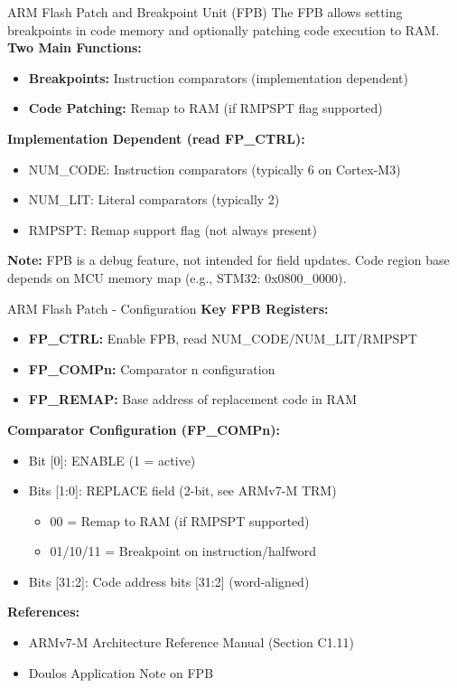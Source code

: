 \documentclass{beamer}
\begin{document}
\begin{frame}{ARM}
	{Flash Patch and Breakpoint Unit (FPB)}
	The FPB allows setting breakpoints in code memory and optionally patching code execution to RAM.\\
	\vspace{0.2cm}
	\textbf{Two Main Functions:}
	\begin{itemize}
		\item \textbf{Breakpoints:} Instruction comparators (implementation dependent)
		\item \textbf{Code Patching:} Remap to RAM (if RMPSPT flag supported)
	\end{itemize}
	\vspace{0.2cm}
	\textbf{Implementation Dependent (read FP\_CTRL):}
	\begin{itemize}
		\item NUM\_CODE: Instruction comparators (typically 6 on Cortex-M3)
		\item NUM\_LIT: Literal comparators (typically 2)
		\item RMPSPT: Remap support flag (not always present)
	\end{itemize}
	\vspace{0.2cm}
	\textbf{Note:} FPB is a debug feature, not intended for field updates. Code region base depends on MCU memory map (e.g., STM32: 0x0800\_0000).
\end{frame}

\begin{frame}{ARM}
	{Flash Patch - Configuration}
	\textbf{Key FPB Registers:}
	\begin{itemize}
		\item \textbf{FP\_CTRL:} Enable FPB, read NUM\_CODE/NUM\_LIT/RMPSPT
		\item \textbf{FP\_COMPn:} Comparator n configuration
		\item \textbf{FP\_REMAP:} Base address of replacement code in RAM
	\end{itemize}
	\vspace{0.2cm}
	\textbf{Comparator Configuration (FP\_COMPn):}
	\begin{itemize}
		\item Bit [0]: ENABLE (1 = active)
		\item Bits [1:0]: REPLACE field (2-bit, see ARMv7-M TRM)
		\begin{itemize}
			\item 00 = Remap to RAM (if RMPSPT supported)
			\item 01/10/11 = Breakpoint on instruction/halfword
		\end{itemize}
		\item Bits [31:2]: Code address bits [31:2] (word-aligned)
	\end{itemize}
	\vspace{0.2cm}
	\textbf{References:}
	\begin{itemize}
		\item ARMv7-M Architecture Reference Manual (Section C1.11)
		\item Doulos Application Note on FPB
	\end{itemize}
\end{frame}
\end{document}
